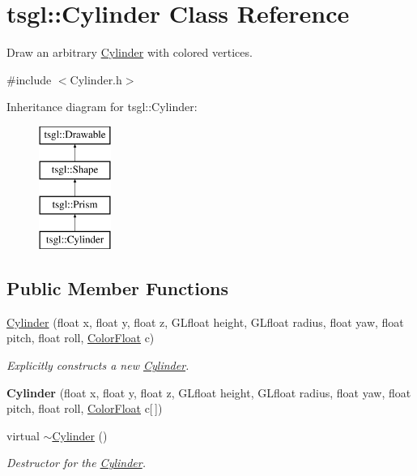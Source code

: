 \hypertarget{classtsgl_1_1_cylinder}{}\section{tsgl\+:\+:Cylinder Class Reference}
\label{classtsgl_1_1_cylinder}


Draw an arbitrary \hyperlink{classtsgl_1_1_cylinder}{Cylinder} with colored vertices.  




{\ttfamily \#include $<$Cylinder.\+h$>$}

Inheritance diagram for tsgl\+:\+:Cylinder\+:\begin{figure}[H]
\begin{center}
\leavevmode
\includegraphics[height=4.000000cm]{classtsgl_1_1_cylinder}
\end{center}
\end{figure}
\subsection*{Public Member Functions}
\begin{DoxyCompactItemize}
\item 
\hyperlink{classtsgl_1_1_cylinder_a4b55b973ed7ac64dcda9a792a8b4d4f7}{Cylinder} (float x, float y, float z, G\+Lfloat height, G\+Lfloat radius, float yaw, float pitch, float roll, \hyperlink{structtsgl_1_1_color_float}{Color\+Float} c)
\begin{DoxyCompactList}\small\item\em Explicitly constructs a new \hyperlink{classtsgl_1_1_cylinder}{Cylinder}. \end{DoxyCompactList}\item 
\mbox{\label{classtsgl_1_1_cylinder_aac310da5e5dd30ea7b41d028c185a050}} 
{\bfseries Cylinder} (float x, float y, float z, G\+Lfloat height, G\+Lfloat radius, float yaw, float pitch, float roll, \hyperlink{structtsgl_1_1_color_float}{Color\+Float} c\mbox{[}$\,$\mbox{]})
\item 
\mbox{\label{classtsgl_1_1_cylinder_a0626417c3035e215b43fa2e38c966962}} 
virtual \hyperlink{classtsgl_1_1_cylinder_a0626417c3035e215b43fa2e38c966962}{$\sim$\+Cylinder} ()
\begin{DoxyCompactList}\small\item\em Destructor for the \hyperlink{classtsgl_1_1_cylinder}{Cylinder}. \end{DoxyCompactList}\end{DoxyCompactItemize}

